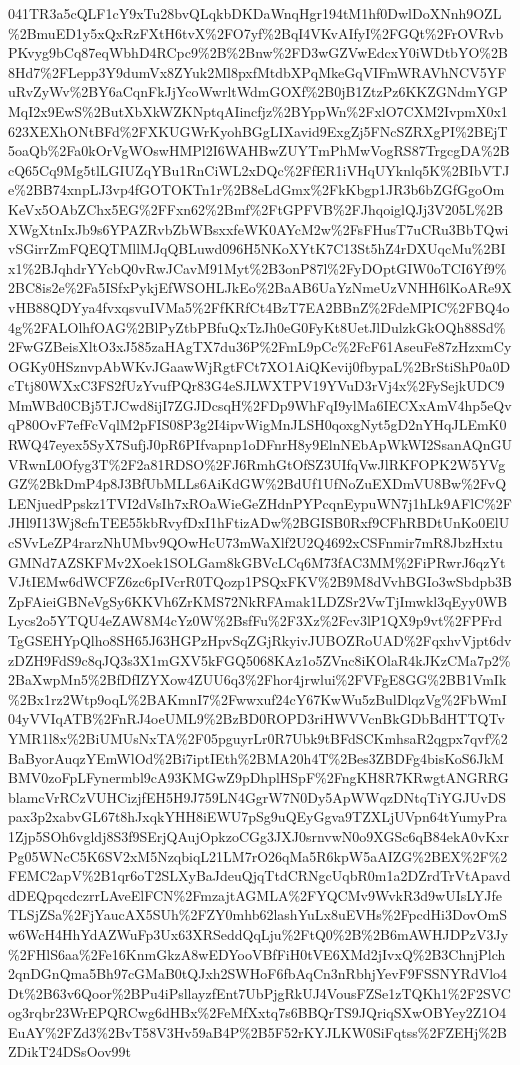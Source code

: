 \documentclass[12pt,letterpaper]{article}
\begin{document}
{\begin{landscape}
\begin{center}
041TR3a5cQLF1cY9xTu28bvQLqkbDKDaWnqHgr194tM1hf0DwlDoXNnh9OZL\%2BmuED1y5xQxRzFXtH6tvX\%2FO7yf\%2BqI4VKvAIfyI\%2FGQt\%2FrOVRvbPKvyg9bCq87eqWbhD4RCpc9\%2B\%2Bnw\%2FD3wGZVwEdcxY0iWDtbYO\%2B8Hd7\%2FLepp3Y9dumVx8ZYuk2Ml8pxfMtdbXPqMkeGqVIFmWRAVhNCV5YFuRvZyWv\%2BY6aCqnFkJjYcoWwrltWdmGOXf\%2B0jB1ZtzPz6KKZGNdmYGPMqI2x9EwS\%2ButXbXkWZKNptqAIincfjz\%2BYppWn\%2FxlO7CXM2IvpmX0x1623XEXhONtBFd\%2FXKUGWrKyohBGgLIXavid9ExgZj5FNcSZRXgPI\%2BEjT5oaQb\%2Fa0kOrVgWOswHMPl2I6WAHBwZUYTmPhMwVogRS87TrgcgDA\%2BcQ65Cq9Mg5tlLGIUZqYBu1RnCiWL2xDQc\%2FfER1iVHqUYknlq5K\%2BIbVTJe\%2BB74xnpLJ3vp4fGOTOKTn1r\%2B8eLdGmx\%2FkKbgp1JR3b6bZGfGgoOmKeVx5OAbZChx5EG\%2FFxn62\%2Bmf\%2FtGPFVB\%2FJhqoiglQJj3V205L\%2BXWgXtnIxJb9s6YPAZRvbZbWBsxxfeWK0AYcM2w\%2FsFHusT7uCRu3BbTQwivSGirrZmFQEQTMllMJqQBLuwd096H5NKoXYtK7C13St5hZ4rDXUqcMu\%2BIx1\%2BJqhdrYYcbQ0vRwJCavM91Myt\%2B3onP87l\%2FyDOptGIW0oTCI6Yf9\%2BC8is2e\%2Fa5ISfxPykjEfWSOHLJkEo\%2BaAB6UaYzNmeUzVNHH6lKoARe9XvHB88QDYya4fvxqsvuIVMa5\%2FfKRfCt4BzT7EA2BBnZ\%2FdeMPIC\%2FBQ4o4g\%2FALOlhfOAG\%2BlPyZtbPBfuQxTzJh0eG0FyKt8UetJlDulzkGkOQh88Sd\%2FwGZBeisXltO3xJ585zaHAgTX7du36P\%2FmL9pCc\%2FcF61AseuFe87zHzxmCyOGKy0HSznvpAbWKvJGaawWjRgtFCt7XO1AiQKevij0fbypaL\%2BrStiShP0a0DcTtj80WXxC3FS2fUzYvufPQr83G4eSJLWXTPV19YVuD3rVj4x\%2FySejkUDC9MmWBd0CBj5TJCwd8ijI7ZGJDcsqH\%2FDp9WhFqI9ylMa6IECXxAmV4hp5eQvqP80OvF7efFcVqlM2pFIS08P3g2I4ipvWigMnJLSH0qoxgNyt5gD2nYHqJLEmK0RWQ47eyex5SyX7SufjJ0pR6PIfvapnp1oDFnrH8y9ElnNEbApWkWI2SsanAQnGUVRwnL0Ofyg3T\%2F2a81RDSO\%2FJ6RmhGtOfSZ3UIfqVwJlRKFOPK2W5YVgGZ\%2BkDmP4p8J3BfUbMLLs6AiKdGW\%2BdUf1UfNoZuEXDmVU8Bw\%2FvQLENjuedPpskz1TVI2dVsIh7xROaWieGeZHdnPYPcqnEypuWN7j1hLk9AFlC\%2FJHl9I13Wj8cfnTEE55kbRvyfDxI1hFtizADw\%2BGISB0Rxf9CFhRBDtUnKo0ElUcSVvLeZP4rarzNhUMbv9QOwHcU73mWaXlf2U2Q4692xCSFnmir7mR8JbzHxtuGMNd7AZSKFMv2Xoek1SOLGam8kGBVcLCq6M73fAC3MM\%2FiPRwrJ6qzYtVJtIEMw6dWCFZ6zc6pIVcrR0TQozp1PSQxFKV\%2B9M8dVvhBGIo3wSbdpb3BZpFAieiGBNeVgSy6KKVh6ZrKMS72NkRFAmak1LDZSr2VwTjImwkl3qEyy0WBLycs2o5YTQU4eZAW8M4cYz0W\%2BsfFu\%2F3Xz\%2Fcv3lP1QX9p9vt\%2FPFrdTgGSEHYpQlho8SH65J63HGPzHpvSqZGjRkyivJUBOZRoUAD\%2FqxhvVjpt6dvzDZH9FdS9c8qJQ3s3X1mGXV5kFGQ5068KAz1o5ZVnc8iKOlaR4kJKzCMa7p2\%2BaXwpMn5\%2BfDfIZYXow4ZUU6q3\%2Fhor4jrwlui\%2FVFgE8GG\%2BB1VmIk\%2Bx1rz2Wtp9oqL\%2BAKmnI7\%2Fwwxuf24cY67KwWu5zBulDlqzVg\%2FbWmI04yVVIqATB\%2FnRJ4oeUML9\%2BzBD0ROPD3riHWVVcnBkGDbBdHTTQTvYMR1l8x\%2BiUMUsNxTA\%2F05pguyrLr0R7Ubk9tBFdSCKmhsaR2qgpx7qvf\%2BaByorAuqzYEmWlOd\%2Bi7iptIEth\%2BMA20h4T\%2Bes3ZBDFg4bisKoS6JkMBMV0zoFpLFynermbl9cA93KMGwZ9pDhplHSpF\%2FngKH8R7KRwgtANGRRGblamcVrRCzVUHCizjfEH5H9J759LN4GgrW7N0Dy5ApWWqzDNtqTiYGJUvDSpax3p2xabvGL67t8hJxqkYHH8iEWU7pSg9uQEyGgva9TZXLjUVpn64tYumyPra1Zjp5SOh6vgldj8S3f9SErjQAujOpkzoCGg3JXJ0srnvwN0o9XGSc6qB84ekA0vKxrPg05WNcC5K6SV2xM5NzqbiqL21LM7rO26qMa5R6kpW5aAIZG\%2BEX\%2F\%2FEMC2apV\%2B1qr6oT2SLXyBaJdeuQjqTtdCRNgcUqbR0m1a2DZrdTrVtApavddDEQpqcdczrrLAveElFCN\%2FmzajtAGMLA\%2FYQCMv9WvkR3d9wUIsLYJfeTLSjZSa\%2FjYaucAX5SUh\%2FZY0mhb62lashYuLx8uEVHs\%2FpcdHi3DovOmSw6WcH4HhYdAZWuFp3Ux63XRSeddQqLju\%2FtQ0\%2B\%2B6mAWHJDPzV3Jy\%2FHlS6aa\%2Fe16KnmGkzA8wEDYooVBfFiH0tVE6XMd2jIvxQ\%2B3ChnjPlch2qnDGnQma5Bh97cGMaB0tQJxh2SWHoF6fbAqCn3nRbhjYevF9FSSNYRdVlo4Dt\%2B63v6Qoor\%2BPu4iPsllayzfEnt7UbPjgRkUJ4VousFZSe1zTQKh1\%2F2SVCog3rqbr23WrEPQRCwg6dHBx\%2FeMfXxtq7s6BBQrTS9JQriqSXwOBYey2Z1O4EuAY\%2FZd3\%2BvT58V3Hv59aB4P\%2B5F52rKYJLKW0SiFqtss\%2FZEHj\%2BZDikT24DSsOov99t
\end{center}
\end{landscape}}
\end{document}
